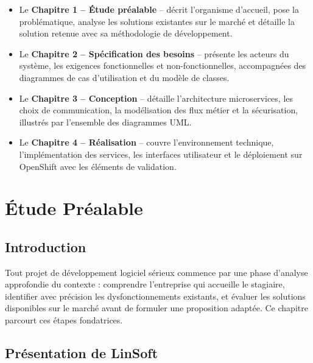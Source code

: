 \documentclass[12pt,a4paper]{report}
\begin{document}
\begin{itemize}[leftmargin=1.5cm]
  \item Le \textbf{Chapitre 1 -- \'Etude pr\'ealable} -- d\'ecrit l'organisme d'accueil, pose
  la probl\'ematique, analyse les solutions existantes sur le march\'e et d\'etaille la
  solution retenue avec sa m\'ethodologie de d\'eveloppement.
  \item Le \textbf{Chapitre 2 -- Sp\'ecification des besoins} -- pr\'esente les acteurs du
  syst\`eme, les exigences fonctionnelles et non-fonctionnelles, accompagn\'ees des
  diagrammes de cas d'utilisation et du mod\`ele de classes.
  \item Le \textbf{Chapitre 3 -- Conception} -- d\'etaille l'architecture microservices, les
  choix de communication, la mod\'elisation des flux m\'etier et la s\'ecurisation, illustr\'es
  par l'ensemble des diagrammes UML.
  \item Le \textbf{Chapitre 4 -- R\'ealisation} -- couvre l'environnement technique,
  l'impl\'ementation des services, les interfaces utilisateur et le d\'eploiement sur
  OpenShift avec les \'el\'ements de validation.
\end{itemize}

\chapter{\'Etude Pr\'ealable}

\section*{Introduction}

Tout projet de d\'eveloppement logiciel s\'erieux commence par une phase d'analyse approfondie
du contexte : comprendre l'entreprise qui accueille le stagiaire, identifier avec pr\'ecision
les dysfonctionnements existants, et \'evaluer les solutions disponibles sur le march\'e avant
de formuler une proposition adapt\'ee. Ce chapitre parcourt ces \'etapes fondatrices.

\section{Pr\'esentation de LinSoft}
\end{document}
